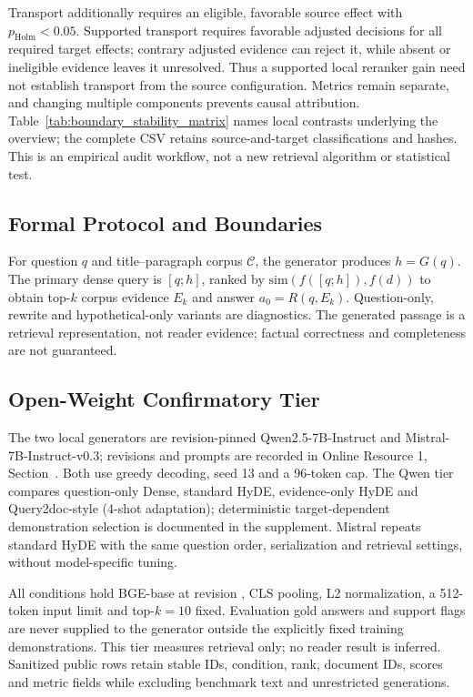 Transport additionally requires an eligible, favorable source effect with $p_{\mathrm{Holm}}<0.05$. Supported transport requires favorable adjusted decisions for all required target effects; contrary adjusted evidence can reject it, while absent or ineligible evidence leaves it unresolved. Thus a supported local reranker gain need not establish transport from the source configuration. Metrics remain separate, and changing multiple components prevents causal attribution. Table~\ref{tab:boundary_stability_matrix} names local contrasts underlying the overview; the complete CSV retains source-and-target classifications and hashes. This is an empirical audit workflow, not a new retrieval algorithm or statistical test.

\subsection{Formal Protocol and Boundaries}
\label{sec:formal_protocol}

For question $q$ and title--paragraph corpus $\mathcal{C}$, the generator produces $h=G(q)$. The primary dense query is $[q;h]$, ranked by $\mathrm{sim}(f([q;h]),f(d))$ to obtain top-$k$ corpus evidence $E_k$ and answer $a_0=R(q,E_k)$. Question-only, rewrite and hypothetical-only variants are diagnostics. The generated passage is a retrieval representation, not reader evidence; factual correctness and completeness are not guaranteed.

\subsection{Open-Weight Confirmatory Tier}
\label{sec:open_weight_confirmatory_tier}

The two local generators are revision-pinned Qwen2.5-7B-Instruct and Mistral-7B-Instruct-v0.3; revisions and prompts are recorded in Online Resource 1, Section~. Both use greedy decoding, seed 13 and a 96-token cap. The Qwen tier compares question-only Dense, standard HyDE, evidence-only HyDE and Query2doc-style (4-shot adaptation); deterministic target-dependent demonstration selection is documented in the supplement. Mistral repeats standard HyDE with the same question order, serialization and retrieval settings, without model-specific tuning.

All conditions hold BGE-base at revision , CLS pooling, L2 normalization, a 512-token input limit and top-$k=10$ fixed. Evaluation gold answers and support flags are never supplied to the generator outside the explicitly fixed training demonstrations. This tier measures retrieval only; no reader result is inferred. Sanitized public rows retain stable IDs, condition, rank, document IDs, scores and metric fields while excluding benchmark text and unrestricted generations.

